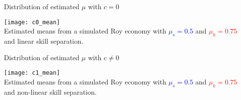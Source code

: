 \documentclass{beamer}
\begin{document}
	\begin{frame}{Distribution of estimated $\mu$ with $c=0$}
		\begin{center}
			\texttt{[image: c0\_mean]}\\
			
			Estimated means from a simulated Roy economy with \textcolor{blue}{$\mu_s = 0.5$} and \textcolor{red}{$\mu_k = 0.75$} and linear skill separation.
		\end{center}
	\end{frame}
	
	\begin{frame}{Distribution of estimated $\mu$ with $c\neq 0$}
				\begin{center}
			\texttt{[image: c1\_mean]}\\
			
			Estimated means from a simulated Roy economy with \textcolor{blue}{$\mu_s = 0.5$} and \textcolor{red}{$\mu_k = 0.75$} and non-linear skill separation. 
		\end{center}
	\end{frame}
	
\end{document}
